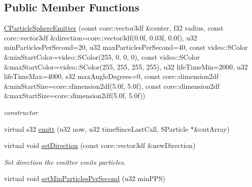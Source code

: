 \subsection*{Public Member Functions}
\begin{DoxyCompactItemize}
\item 
\hypertarget{classirr_1_1scene_1_1_c_particle_sphere_emitter_a7e883428b6958bfaaf0d6dae4c5d0375}{\hyperlink{classirr_1_1scene_1_1_c_particle_sphere_emitter_a7e883428b6958bfaaf0d6dae4c5d0375}{C\-Particle\-Sphere\-Emitter} (const core\-::vector3df \&center, f32 radius, const core\-::vector3df \&direction=core\-::vector3df(0.\-0f, 0.\-03f, 0.\-0f), u32 min\-Particles\-Per\-Second=20, u32 max\-Particles\-Per\-Second=40, const video\-::\-S\-Color \&min\-Start\-Color=video\-::\-S\-Color(255, 0, 0, 0), const video\-::\-S\-Color \&max\-Start\-Color=video\-::\-S\-Color(255, 255, 255, 255), u32 life\-Time\-Min=2000, u32 life\-Time\-Max=4000, s32 max\-Angle\-Degrees=0, const core\-::dimension2df \&min\-Start\-Size=core\-::dimension2df(5.\-0f, 5.\-0f), const core\-::dimension2df \&max\-Start\-Size=core\-::dimension2df(5.\-0f, 5.\-0f))}\label{classirr_1_1scene_1_1_c_particle_sphere_emitter_a7e883428b6958bfaaf0d6dae4c5d0375}

\begin{DoxyCompactList}\small\item\em constructor \end{DoxyCompactList}\item 
virtual s32 \hyperlink{classirr_1_1scene_1_1_c_particle_sphere_emitter_a0ceac35e1ccbdd637cd1b320497fb7c9}{emitt} (u32 now, u32 time\-Since\-Last\-Call, S\-Particle $\ast$\&out\-Array)
\item 
\hypertarget{classirr_1_1scene_1_1_c_particle_sphere_emitter_a0893c0d871eb3204f0393555310f9830}{virtual void \hyperlink{classirr_1_1scene_1_1_c_particle_sphere_emitter_a0893c0d871eb3204f0393555310f9830}{set\-Direction} (const core\-::vector3df \&new\-Direction)}\label{classirr_1_1scene_1_1_c_particle_sphere_emitter_a0893c0d871eb3204f0393555310f9830}

\begin{DoxyCompactList}\small\item\em Set direction the emitter emits particles. \end{DoxyCompactList}\item 
\hypertarget{classirr_1_1scene_1_1_c_particle_sphere_emitter_a2ebe336606d9a7856041584b3e0b878b}{virtual void \hyperlink{classirr_1_1scene_1_1_c_particle_sphere_emitter_a2ebe336606d9a7856041584b3e0b878b}{set\-Min\-Particles\-Per\-Second} (u32 min\-P\-P\-S)}\label{classirr_1_1scene_1_1_c_particle_sphere_emitter_a2ebe336606d9a7856041584b3e0b878b}


\end{DoxyCompactItemize}

